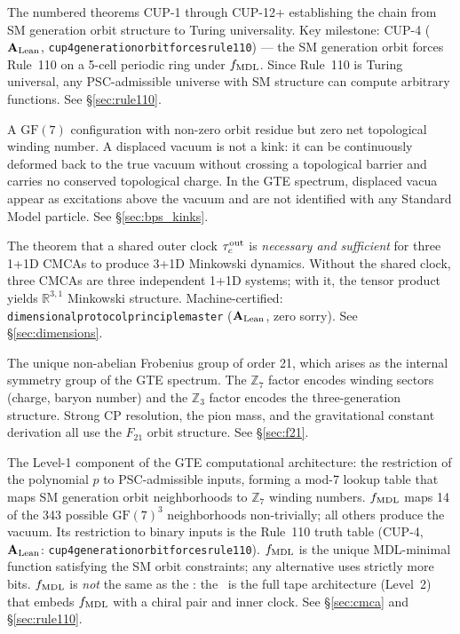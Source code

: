 \documentclass[11pt,openany]{book}
\theoremstyle{remark}
\newcommand{\lean}[1]{%
  \penalty-100
  \begingroup\def\_{\textunderscore\allowbreak}\texttt{#1}\endgroup}
\newcommand{\CMCA}{\text{CMCA}}
\newcommand{\CatAL}{\ensuremath{\textbf{A}_{\rm Lean}}}
\begin{document}
\begin{appendices}
\begin{description}[leftmargin=*,font=\bfseries,itemsep=6pt]
\item[CUP --- Computational Universality Property]
The numbered theorems CUP-1 through CUP-12+ establishing the chain from SM
generation orbit structure to Turing universality.
Key milestone: CUP-4 (\CatAL, \lean{cup4\_generation\_orbit\_forces\_rule110}) —
the SM generation orbit forces Rule~110 on a 5-cell periodic ring under $f_{\rm MDL}$.
Since Rule~110 is Turing universal, any PSC-admissible universe with SM structure can
compute arbitrary functions.
See \S\ref{sec:rule110}.

\item[Displaced vacuum]
A $\mathrm{GF}(7)$ configuration with non-zero orbit residue but zero net topological
winding number.
A displaced vacuum is not a kink: it can be continuously deformed back to the true
vacuum without crossing a topological barrier and carries no conserved topological
charge.
In the GTE spectrum, displaced vacua appear as excitations above the vacuum and are
not identified with any Standard Model particle.
See \S\ref{sec:bps_kinks}.

\item[DPP --- Dimensional Protocol Principle]
The theorem that a shared outer clock $\tau_c^{\rm out}$ is \emph{necessary and
sufficient} for three 1+1D CMCAs to produce 3+1D Minkowski dynamics.
Without the shared clock, three CMCAs are three independent 1+1D systems; with it,
the tensor product yields $\mathbb{R}^{3,1}$ Minkowski structure.
Machine-certified: \lean{dimensional\_protocol\_principle\_master} (\CatAL, zero
sorry).
See \S\ref{sec:dimensions}.

\item[$F_{21}$ --- Frobenius group $\mathbb{Z}_7 \rtimes \mathbb{Z}_3$]
The unique non-abelian Frobenius group of order 21, which arises as the internal
symmetry group of the GTE spectrum.
The $\mathbb{Z}_7$ factor encodes winding sectors (charge, baryon number) and
the $\mathbb{Z}_3$ factor encodes the three-generation structure.
Strong CP resolution, the pion mass, and the gravitational constant derivation all
use the $F_{21}$ orbit structure.
See \S\ref{sec:f21}.

\item[$f_{\rm MDL}$ --- Level-1 PSC-orbit map]
The Level-1 component of the GTE computational architecture: the restriction of
the polynomial $p$ to PSC-admissible inputs, forming a mod-7 lookup table that maps
SM generation orbit neighborhoods to $\mathbb{Z}_7$ winding numbers.
$f_{\rm MDL}$ maps 14 of the 343 possible $\mathrm{GF}(7)^3$ neighborhoods
non-trivially; all others produce the vacuum.
Its restriction to binary inputs is the Rule~110 truth table (CUP-4, \CatAL:
\lean{cup4\_generation\_orbit\_forces\_rule110}).
$f_{\rm MDL}$ is the unique MDL-minimal function satisfying the SM orbit
constraints; any alternative uses strictly more bits.
$f_{\rm MDL}$ is \emph{not} the same as the \CMCA: the \CMCA\ is the full tape
architecture (Level~2) that embeds $f_{\rm MDL}$ with a chiral pair and inner clock.
See \S\ref{sec:cmca} and \S\ref{sec:rule110}.


\end{description}
\end{appendices}
\end{document}
